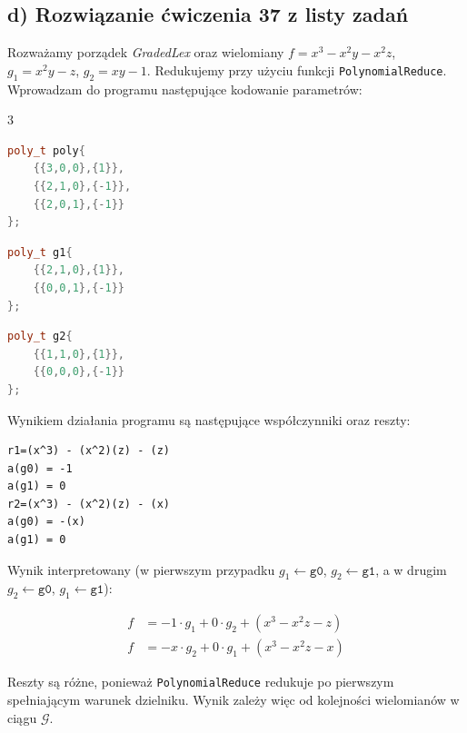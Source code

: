 \documentclass[10pt, a4paper]{article}
\begin{document}
\subsection*{d) Rozwiązanie ćwiczenia 37 z listy zadań}

Rozważamy porządek \textit{GradedLex} oraz wielomiany $f=x^3-x^2y-x^2z$, $g_1=x^2y-z$, $g_2=xy-1$. Redukujemy przy użyciu funkcji \texttt{PolynomialReduce}.
Wprowadzam do programu następujące kodowanie parametrów:

\begin{multicols}{3}
\begin{lstlisting}[language=c++]
poly_t poly{
    {{3,0,0},{1}},
    {{2,1,0},{-1}},
    {{2,0,1},{-1}}
};
\end{lstlisting}

\begin{lstlisting}[language=c++]
poly_t g1{
    {{2,1,0},{1}},
    {{0,0,1},{-1}}
};
\end{lstlisting}

\begin{lstlisting}[language=c++]
poly_t g2{
    {{1,1,0},{1}},
    {{0,0,0},{-1}}
};
\end{lstlisting}
\end{multicols}

\noindent
Wynikiem działania programu są następujące współczynniki oraz reszty:

\begin{verbatim}
r1=(x^3) - (x^2)(z) - (z)
a(g0) = -1
a(g1) = 0
r2=(x^3) - (x^2)(z) - (x)
a(g0) = -(x)
a(g1) = 0
\end{verbatim}
\normalsize

\noindent
Wynik interpretowany (w pierwszym przypadku $g_1 \gets \texttt{g0}$, $g_2 \gets \texttt{g1}$, a w drugim $g_2 \gets \texttt{g0}$, $g_1 \gets \texttt{g1}$):

\begin{align*}
    f &= -1 \cdot g_1 + 0 \cdot g_2 + (x^3 - x^2z - z) \\
    f &= -x \cdot g_2 + 0 \cdot g_1 + (x^3 - x^2z - x)
\end{align*}

\noindent
Reszty są różne, ponieważ \texttt{PolynomialReduce} redukuje po pierwszym spełniającym warunek dzielniku. 
Wynik zależy więc od kolejności wielomianów w ciągu $\mathcal{G}$.\\
\end{document}
